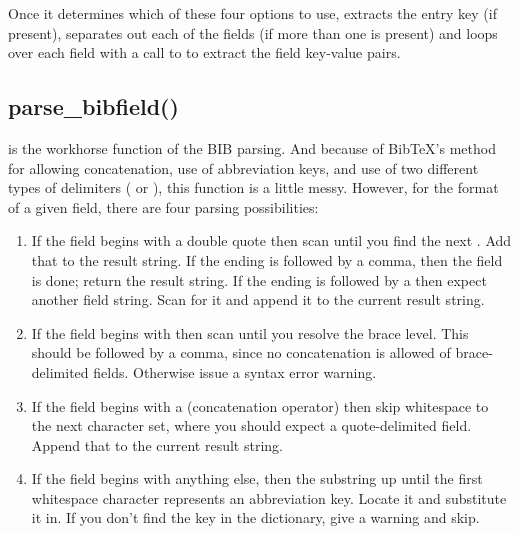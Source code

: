 \documentclass[letterpaper,10pt,english]{sphinxmanual}
\begin{document}
Once it determines which of these four options to use,  extracts the entry key (if present), separates out each of the fields (if more than one is present) and loops over each field with a call to  to extract the field key-value pairs.


\subsection{parse\_bibfield()}
\label{developer_guide:parse-bibfield}
 is the workhorse function of the BIB parsing. And because of BibTeX's method for allowing concatenation, use of abbreviation keys, and use of two different types of delimiters ( or ), this function is a little messy. However, for the format of a given field, there are four parsing possibilities:
\begin{enumerate}
\item {} 
If the field begins with a double quote  then scan until you find the next . Add that to the result string. If the ending  is followed by a comma, then the field is done; return the result string. If the ending is followed by a \code{\#} then expect another field string. Scan for it and append it to the current result string.

\item {} 
If the field begins with \code{\{} then scan until you resolve the brace level. This should be followed by a comma, since no concatenation is allowed of brace-delimited fields. Otherwise issue a syntax error warning.

\item {} 
If the field begins with a \code{\#} (concatenation operator) then skip whitespace to the next character set, where you should expect a quote-delimited field. Append that to the current result string.

\item {} 
If the field begins with anything else, then the substring up until the first whitespace character represents an abbreviation key. Locate it and substitute it in. If you don't find the key in the  dictionary, give a warning and skip.

\end{enumerate}
\end{document}
